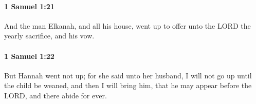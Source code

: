 		\paragraph{1 Samuel 1:21} %
			\label{1SAMUEL-1-21}

			And the man Elkanah, and all his house, went up to offer unto the LORD the yearly sacrifice, and his vow.


		\paragraph{1 Samuel 1:22} %
			\label{1SAMUEL-1-22}

			But Hannah went not up; for she said unto her husband, I will not go up until the child be weaned, and then I will bring him, that he may appear before the LORD, and there abide for ever.


